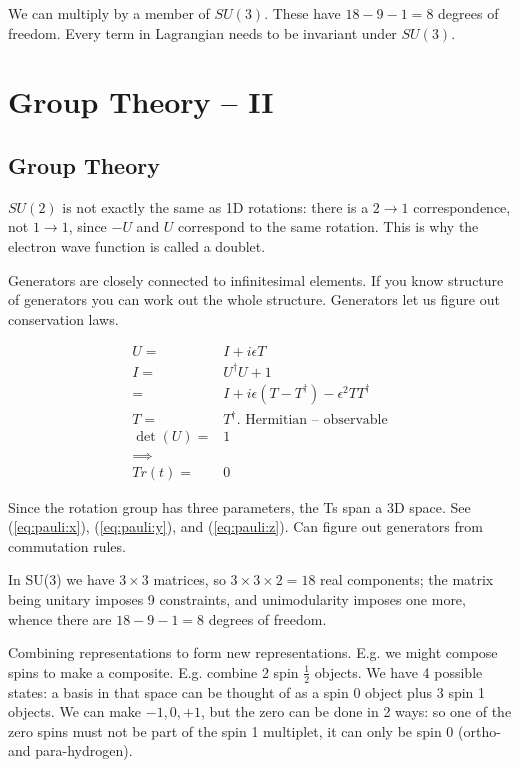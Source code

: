 \documentclass[]{article}
\begin{document}
We can multiply by a member of $SU(3)$. These have $18-9-1=8$ degrees of freedom. Every term in Lagrangian needs to be invariant under $SU(3)$.  


\section{Group Theory – II}

\subsection{Group Theory}
$SU(2)$ is not exactly the same as 1D rotations: there is a $2\rightarrow1$ correspondence, not  $1\rightarrow1$, since $-U$ and $U$ correspond to the same rotation. This is why the electron wave function is called a doublet.

Generators are closely connected to infinitesimal elements. If you know structure of generators you can work out the whole structure. Generators let us figure out conservation laws.

\begin{align*}
	U =& I + i \epsilon T\\
	I =& U^\dagger U + 1\\
	=& I + i\epsilon(T - T^\dagger) - \epsilon^2 T T^\dagger\\
	T =& T^\dagger \text{. Hermitian -- observable}\\
	\det(U) =& 1\\
	\implies&\\
	Tr(t)=&0
\end{align*}

Since the rotation group has three parameters, the Ts span a 3D space. See (\ref{eq:pauli:x}), (\ref{eq:pauli:y}), and (\ref{eq:pauli:z}). Can figure out generators from commutation rules.

In SU(3) we have $3\times3$ matrices, so $3\times3\times2=18$ real components; the matrix being unitary imposes 9 constraints, and unimodularity imposes one more, whence there are $18-9-1=8$ degrees of freedom.

Combining representations to form new representations. E.g. we might compose spins to make a composite. E.g. combine 2 spin $\frac{1}{2}$ objects. We have 4 possible states: a basis in that space can be thought of as a spin 0 object plus 3 spin 1 objects. We can make ${-1,0,+1}$, but the zero can be done in 2 ways: so one of the zero spins must not be part of the spin 1 multiplet, it can only be spin 0 (ortho- and para-hydrogen).
\end{document}
